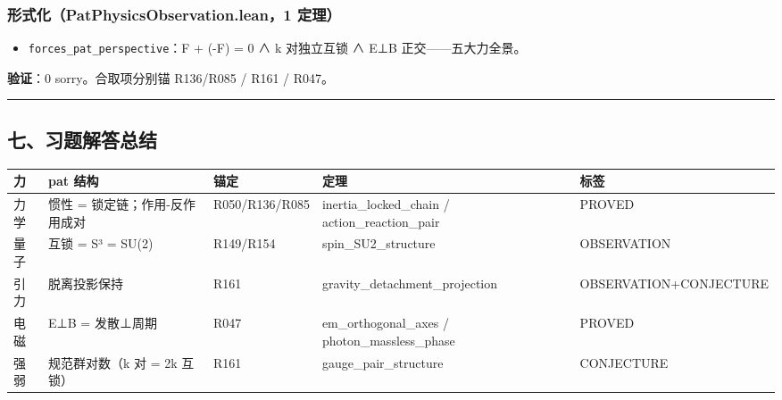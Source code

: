 \documentclass[
]{article}
\newcounter{none} %
\providecommand{\tightlist}{%
 \setlength{\itemsep}{0pt}\setlength{\parskip}{0pt}}
\begin{document}
\subsubsection{形式化（PatPhysicsObservation.lean，1
定理）}\label{ux5f62ux5f0fux5316patphysicsobservation.lean1-ux5b9aux7406-3}

\begin{itemize}
\tightlist
\item
 \texttt{forces\_pat\_perspective}：F + (-F) = 0 ∧ k 对独立互锁 ∧ E⊥B
 正交------五大力全景。
\end{itemize}

\textbf{验证}：0 sorry。合取项分别锚 R136/R085 / R161 / R047。

\begin{center}\rule{0.5\linewidth}{0.5pt}\end{center}

\subsection{七、习题解答总结}\label{ux4e03ux4e60ux9898ux89e3ux7b54ux603bux7ed3}

{\def\LTcaptype{none} %
\begin{longtable}[]{@{}
 >{\raggedright\arraybackslash}p{}
 >{\raggedright\arraybackslash}p{}
 >{\raggedright\arraybackslash}p{}
 >{\raggedright\arraybackslash}p{}
 >{\raggedright\arraybackslash}p{}@{}}
\toprule\noalign{}
\begin{minipage}[b]{\linewidth}\raggedright
力
\end{minipage} & \begin{minipage}[b]{\linewidth}\raggedright
pat 结构
\end{minipage} & \begin{minipage}[b]{\linewidth}\raggedright
锚定
\end{minipage} & \begin{minipage}[b]{\linewidth}\raggedright
定理
\end{minipage} & \begin{minipage}[b]{\linewidth}\raggedright
标签
\end{minipage} \\
\midrule\noalign{}
\endhead
\bottomrule\noalign{}
\endlastfoot
力学 & 惯性 = 锁定链；作用-反作用成对 & R050/R136/R085 &
inertia\_locked\_chain / action\_reaction\_pair & PROVED \\
量子 & 4 互锁 = S³ = SU(2) & R149/R154 & spin\_SU2\_structure &
OBSERVATION \\
引力 & 脱离投影保持 & R161 & gravity\_detachment\_projection &
OBSERVATION+CONJECTURE \\
电磁 & E⊥B = 发散⊥周期 & R047 & em\_orthogonal\_axes /
photon\_massless\_phase & PROVED \\
强弱 & 规范群对数（k 对 = 2k 互锁） & R161 & gauge\_pair\_structure &
CONJECTURE \\
\end{longtable}
}
\end{document}
